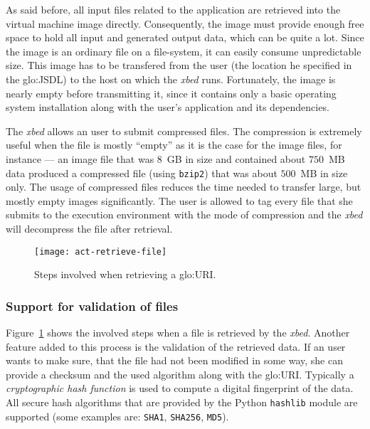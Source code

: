 As said before,  all input files related to  the application are retrieved
into  the virtual  machine image  directly. Consequently,  the  image must
provide enough  free space  to hold all  input and generated  output data,
which  can be  quite a  lot. Since  the  image is  an ordinary  file on  a
file-system, it can  easily consume unpredictable size. This  image has to
be  transfered  from  the user  (\ie  the  location  he specified  in  the
\gls{glo:JSDL}) to  the host on  which the \emph{xbed}  runs. Fortunately,
the image is nearly empty before transmitting it, since it contains only a
basic operating system installation  along with the user's application and
its dependencies.

The \emph{xbed} allows an user to submit compressed files. The compression
is extremely  useful when the file is  mostly ``empty'' as it  is the case
for the  image files, for  instance --- an  image file that was  $8$~GB in
size and contained  about $750$~MB data produced a  compressed file (using
\texttt{bzip2})  that was  about  $500$~MB  in size  only.   The usage  of
compressed files  reduces the  time needed to  transfer large,  but mostly
empty images significantly. The user is allowed to tag every file that she
submits to the execution environment  with the mode of compression and the
\emph{xbed} will decompress the file after retrieval.

\begin{figure}[ht]
  \centering
  \texttt{[image: act-retrieve-file]}
  \caption[File  Retrieval  Activity]{Steps  involved when  retrieving  a
    \gls{glo:URI}.}
  \label{fig:act-retrieve-file}
\end{figure}

\subsubsection{Support for validation of files}

Figure~\ref{fig:act-retrieve-file} shows the involved steps when a file is
retrieved by the \emph{xbed}. Another feature added to this process is the
validation of the retrieved data. If  an user wants to make sure, that the
file had not been modified in some way, she can provide a checksum and the
used    algorithm   along   with    the   \gls{glo:URI}.     Typically   a
\emph{cryptographic  hash   function}  is   used  to  compute   a  digital
fingerprint of the  data. All secure hash algorithms  that are provided by
the  Python  \texttt{hashlib} module  are  supported  (some examples  are:
\texttt{SHA1}, \texttt{SHA256}, \texttt{MD5}).

